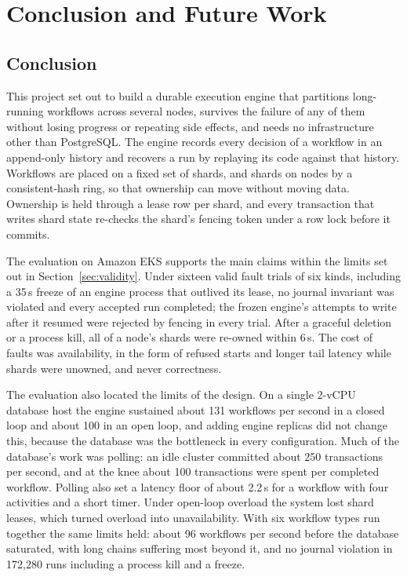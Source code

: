 \clearpage
\chapter{Conclusion and Future Work}

\section{Conclusion}

This project set out to build a durable execution engine that partitions
long-running workflows across several nodes, survives the failure of any of
them without losing progress or repeating side effects, and needs no
infrastructure other than PostgreSQL. The engine records every decision of a
workflow in an append-only history and recovers a run by replaying its code
against that history. Workflows are placed on a fixed set of shards, and
shards on nodes by a consistent-hash ring, so that ownership can move without
moving data. Ownership is held through a lease row per shard, and every
transaction that writes shard state re-checks the shard's fencing token under
a row lock before it commits.

The evaluation on Amazon EKS supports the main claims within the limits set
out in Section~\ref{sec:validity}. Under sixteen valid fault trials of six kinds, including
a 35\,s freeze of an engine process that outlived its lease, no journal
invariant was violated and every accepted run completed; the frozen engine's
attempts to write after it resumed were rejected by fencing in every trial.
After a graceful deletion or a process kill, all of a node's shards were
re-owned within 6\,s. The cost of faults was availability, in the form of
refused starts and longer tail latency while shards were unowned, and never
correctness.

The evaluation also located the limits of the design. On a single 2-vCPU
database host the engine sustained about 131 workflows per second in a
closed loop and about 100 in an open loop, and adding engine replicas did not
change this, because the database was the bottleneck in every configuration.
Much of the database's work was polling: an idle cluster committed about 250
transactions per second, and at the knee about 100 transactions were spent
per completed workflow. Polling also set a latency floor of about 2.2\,s for a
workflow with four activities and a short timer. Under open-loop overload the
system lost shard leases, which turned overload into unavailability. With
six workflow types run together the same limits held: about 96 workflows per
second before the database saturated, with long chains suffering most beyond
it, and no journal violation in 172,280 runs including a process kill and a
freeze.

